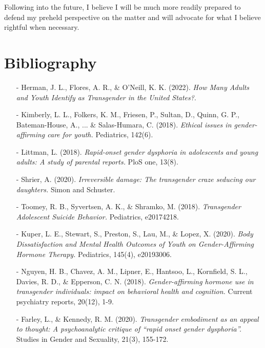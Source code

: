 \documentclass{article}
\begin{document}
Following into the future, I believe I will be much more readily prepared to defend my preheld perspective on the matter and will advocate for what I believe rightful when necessary.

\newpage

\section{Bibliography}

\begin{enumerate}

\item[-]Herman, J. L., Flores, A. R., \& O'Neill, K. K. (2022). \textit{How Many Adults and Youth Identify as Transgender in the United States?}.

\item[-]Kimberly, L. L., Folkers, K. M., Friesen, P., Sultan, D., Quinn, G. P., Bateman-House, A., ... \& Salas-Humara, C. (2018). \textit{Ethical issues in gender-affirming care for youth.} Pediatrics, 142(6).

\item[-]Littman, L. (2018). \textit{Rapid-onset gender dysphoria in adolescents and young adults: A study of parental reports.} PloS one, 13(8).

\item[-]Shrier, A. (2020). \textit{Irreversible damage: The transgender craze seducing our daughters.} Simon and Schuster.

\item[-]Toomey, R. B., Syvertsen, A. K., \& Shramko, M. (2018). \textit{Transgender Adolescent Suicide Behavior.} Pediatrics, e20174218.

\item[-]Kuper, L. E., Stewart, S., Preston, S., Lau, M., \& Lopez, X. (2020). \textit{Body Dissatisfaction and Mental Health Outcomes of Youth on Gender-Affirming Hormone Therapy.} Pediatrics, 145(4), e20193006.

\item[-]Nguyen, H. B., Chavez, A. M., Lipner, E., Hantsoo, L., Kornfield, S. L., Davies, R. D., \& Epperson, C. N. (2018). \textit{Gender-affirming hormone use in transgender individuals: impact on behavioral health and cognition.} Current psychiatry reports, 20(12), 1-9.

\item[-]Farley, L., \& Kennedy, R. M. (2020). \textit{Transgender embodiment as an appeal to thought: A psychoanalytic critique of “rapid onset gender dysphoria”.} Studies in Gender and Sexuality, 21(3), 155-172.


\end{enumerate}
\end{document}
